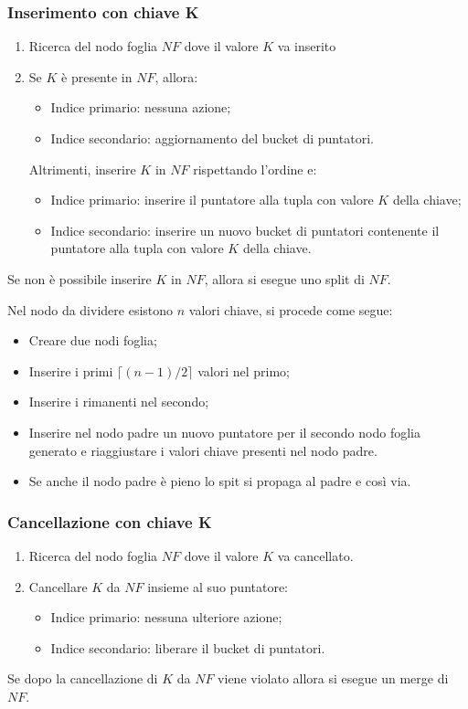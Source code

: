 \documentclass[oneside,a4paper,11pt]{book}
\theoremstyle{italicstyle}
\theoremstyle{normStyle}
\begin{document}
\subsubsection{Inserimento con chiave K}
\begin{enumerate}
  \item Ricerca del nodo foglia $NF$ dove il valore $K$ va inserito
  \item Se $K$ è presente in $NF$, allora:
  \begin{itemize}
    \item Indice primario: nessuna azione;
    \item Indice secondario: aggiornamento del bucket di puntatori.
  \end{itemize}
  Altrimenti, inserire $K$ in $NF$ rispettando l'ordine e:
  \begin{itemize}
    \item Indice primario: inserire il puntatore alla tupla con valore $K$ 
    della chiave;
    \item Indice secondario: inserire un nuovo bucket di puntatori contenente 
    il puntatore alla tupla con valore $K$ della chiave.
  \end{itemize}
\end{enumerate}
Se non è possibile inserire $K$ in $NF$, allora si esegue uno split di $NF$.

Nel nodo da dividere esistono $n$ valori chiave, si procede come segue:
\begin{itemize}
  \item Creare due nodi foglia;
  \item Inserire i primi $\lceil (n-1)/2\rceil$ valori nel primo;
  \item Inserire i rimanenti nel secondo;
  \item Inserire nel nodo padre un nuovo puntatore per il secondo nodo 
  foglia generato e riaggiustare i valori chiave presenti nel nodo padre.
  \item Se anche il nodo padre è pieno lo spit si propaga al padre e così via.
\end{itemize}
\subsubsection{Cancellazione con chiave K}
\begin{enumerate}
  \item Ricerca del nodo foglia $NF$ dove il valore $K$ va cancellato.
  \item Cancellare $K$ da $NF$ insieme al suo puntatore:
  \begin{itemize}
    \item Indice primario: nessuna ulteriore azione;
    \item Indice secondario: liberare il bucket di puntatori.
  \end{itemize}
\end{enumerate}
Se dopo la cancellazione di $K$ da $NF$ viene violato allora si esegue un merge di $NF$.
\end{document}
